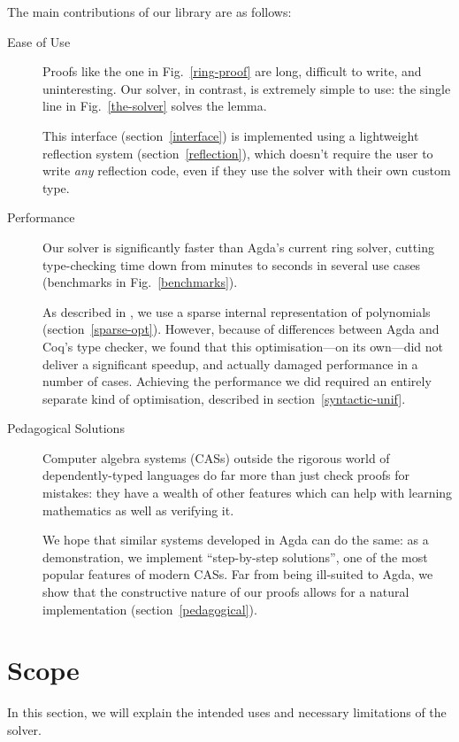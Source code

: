 \documentclass[acmsmall,review,anonymous]{acmart}\settopmatter{printfolios=true,printccs=false,printacmref=false}
\theoremstyle{remark}
\begin{document}
The main contributions of our library are as follows:
\begin{description}
  \item[Ease of Use] Proofs like the one in Fig.~\ref{ring-proof} are long,
    difficult to write, and uninteresting. Our solver, in contrast, is extremely
    simple to use: the single line in Fig.~\ref{the-solver} solves the lemma.

    This interface (section~\ref{interface}) is implemented using a lightweight
    reflection system (section~\ref{reflection}), which doesn't require the user
    to write \emph{any} reflection code, even if they use the solver with their
    own custom type. 
  \item[Performance] Our solver is significantly faster than Agda's current ring
    solver, cutting type-checking time down from minutes to seconds in several
    use cases (benchmarks in Fig.~\ref{benchmarks}).

    As described in \citet{gregoire_proving_2005}, we use a sparse internal
    representation of polynomials (section~\ref{sparse-opt}). However, because
    of differences between Agda and Coq's type checker, we found that this
    optimisation---on its own---did not deliver a significant speedup, and
    actually damaged performance in a number of cases. Achieving the performance
    we did required an entirely separate kind of optimisation, described in
    section~\ref{syntactic-unif}.
  \item[Pedagogical Solutions] Computer algebra systems (CASs) outside the
    rigorous world of dependently-typed languages do far more than just check
    proofs for mistakes: they have a wealth of other features which can help
    with learning mathematics as well as verifying it.

    We hope that similar systems developed in Agda can do the same: as a
    demonstration, we implement ``step-by-step solutions'', one of the most
    popular features of modern CASs. Far from being ill-suited to Agda, we show
    that the constructive nature of our proofs allows for a natural
    implementation (section~\ref{pedagogical}).
\end{description}
\section{Scope}
In this section, we will explain the intended uses and necessary limitations of
the solver.
\end{document}

